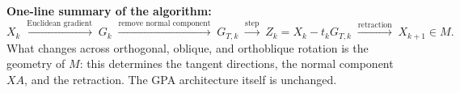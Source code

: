 \documentclass[10pt,a4paper]{article}
\begin{document}
\vspace{2mm}
\colorbox{subhead}{\parbox{0.985\textwidth}{
\textbf{One-line summary of the algorithm:}
\[
X_k\;\xrightarrow{\text{Euclidean gradient}}\;G_k
\;\xrightarrow{\text{remove normal component}}\;G_{T,k}
\;\xrightarrow{\text{step}}\;Z_k=X_k-t_kG_{T,k}
\;\xrightarrow{\text{retraction}}\;X_{k+1}\in M.
\]
What changes across orthogonal, oblique, and orthoblique rotation is the geometry of $M$: this determines the tangent directions, the normal component $XA$, and the retraction. The GPA architecture itself is unchanged.
}}
\end{document}
